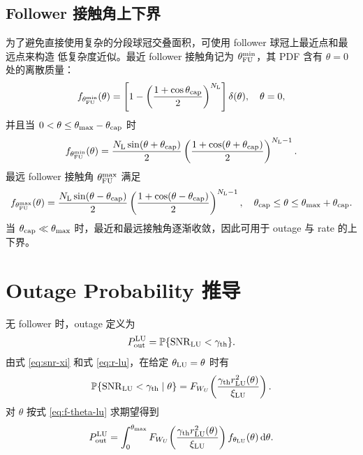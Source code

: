 \documentclass[UTF8,a4paper,11pt]{ctexart}
\newcommand{\thetac}{\theta_{\rm cap}}
\newcommand{\thetam}{\theta_{\max}}
\newcommand{\NL}{N_{\rm L}}
\newcommand{\SNR}{\operatorname{SNR}}
\newcommand{\Prob}{\mathbb{P}}
\newcommand{\dd}{\,{\rm d}}
\newcommand{\rLU}{r_{\rm LU}}
\begin{document}
\subsection{Follower 接触角上下界}

为了避免直接使用复杂的分段球冠交叠面积，可使用 follower 球冠上最近点和最远点来构造
低复杂度近似。最近 follower 接触角记为 $\theta_{\rm FU}^{\min}$，其 PDF 含有
$\theta=0$ 处的离散质量：
\begin{equation}
    f_{\theta_{\rm FU}^{\min}}(\theta)
    =
    \left[1-\left(\frac{1+\cos\thetac}{2}\right)^{\NL}\right]\delta(\theta),
    \quad \theta=0,
\end{equation}
并且当 $0<\theta\leq\thetam-\thetac$ 时
\begin{equation}
    f_{\theta_{\rm FU}^{\min}}(\theta)
    =
    \frac{\NL\sin(\theta+\thetac)}{2}
    \left(\frac{1+\cos(\theta+\thetac)}{2}\right)^{\NL-1}.
    \label{eq:f-min}
\end{equation}
最远 follower 接触角 $\theta_{\rm FU}^{\max}$ 满足
\begin{equation}
    f_{\theta_{\rm FU}^{\max}}(\theta)
    =
    \frac{\NL\sin(\theta-\thetac)}{2}
    \left(\frac{1+\cos(\theta-\thetac)}{2}\right)^{\NL-1},
    \quad \thetac\leq\theta\leq\thetam+\thetac .
    \label{eq:f-max}
\end{equation}
当 $\thetac\ll\thetam$ 时，最近和最远接触角逐渐收敛，因此可用于 outage 与 rate 的上下界。

\section{Outage Probability 推导}

无 follower 时，outage 定义为
\begin{equation}
    P_{\rm out}^{\rm LU}=\Prob\{\SNR_{\rm LU}<\gamma_{\rm th}\}.
\end{equation}
由式 \eqref{eq:snr-xi} 和式 \eqref{eq:r-lu}，在给定 $\theta_{\rm LU}=\theta$ 时有
\begin{equation}
    \Prob\{\SNR_{\rm LU}<\gamma_{\rm th}\mid\theta\}
    =
    F_{W_U}\!\left(\frac{\gamma_{\rm th}\rLU^2(\theta)}{\xi_{\rm LU}}\right).
\end{equation}
对 $\theta$ 按式 \eqref{eq:f-theta-lu} 求期望得到
\begin{equation}
    P_{\rm out}^{\rm LU}
    =
    \int_{0}^{\thetam}
    F_{W_U}\!\left(\frac{\gamma_{\rm th}\rLU^2(\theta)}{\xi_{\rm LU}}\right)
    f_{\theta_{\rm LU}}(\theta)\dd\theta.
    \label{eq:outage-leader}
\end{equation}
\end{document}
